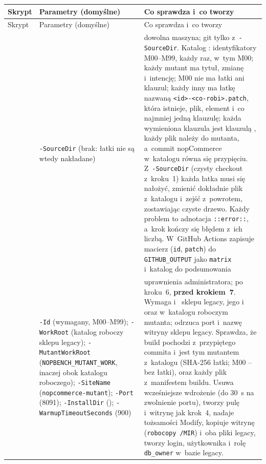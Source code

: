 {\footnotesize
\begin{xltabular}{\linewidth}{@{}>{\raggedright\arraybackslash}p{3.1cm} >{\raggedright\arraybackslash}p{3.7cm} >{\raggedright\arraybackslash}X@{}}
\toprule
Skrypt & Parametry (domyślne) & Co sprawdza i~co tworzy \\
\midrule
\endfirsthead
\toprule
Skrypt & Parametry (domyślne) & Co sprawdza i~co tworzy \\
\midrule
\endhead
\bottomrule
\endlastfoot
{} & \texttt{-SourceDir} (brak: łatki nie są wtedy nakładane) &
  dowolna maszyna; git tylko z~\texttt{-SourceDir}. Katalog :
  identyfikatory M00--M99, każdy raz, w~tym M00; każdy mutant ma tytuł, zmianę i~intencję;
  M00 nie ma łatki ani klauzul; każdy inny ma łatkę nazwaną \texttt{<id>-<co-robi>.patch},
  która istnieje, plik, element i~co najmniej jedną klauzulę; każda wymieniona klauzula jest
  klauzulą , każdy plik  należy do mutanta,
  a~commit nopCommerce w~katalogu równa się przypięciu. Z~\texttt{-SourceDir} (czysty checkout
  z~kroku~1) każda łatka musi się nałożyć, zmienić dokładnie plik z~katalogu i~zejść
  z~powrotem, zostawiając czyste drzewo. Każdy problem to adnotacja \texttt{::error::}, a~krok
  kończy się błędem z~ich liczbą. W~GitHub Actions zapisuje macierz (\texttt{id},
  \texttt{patch}) do \texttt{GITHUB\_OUTPUT} jako \texttt{matrix} i~katalog do podsumowania \\
 & \texttt{-Id} (wymagany, M00--M99); \texttt{-WorkRoot} (katalog
  roboczy sklepu legacy); \texttt{-MutantWorkRoot} (\texttt{NOPBENCH\_MUTANT\_WORK}, inaczej
   obok katalogu roboczego); \texttt{-SiteName} (\texttt{nopcommerce-mutant});
  \texttt{-Port} (8091); \texttt{-InstallDir} ();
  \texttt{-WarmupTimeoutSeconds} (900) &
  uprawnienia administratora; po kroku~6, \textbf{przed krokiem~7}. Wymaga 
  i~ sklepu legacy, jego 
  i~ oraz  w~katalogu roboczym mutanta; odrzuca port
  i~nazwę witryny sklepu legacy. Sprawdza, że build pochodzi z~przypiętego commita i~jest tym
  mutantem z~katalogu (SHA-256 łatki; M00 -- bez łatki), oraz każdy plik z~manifestem buildu.
  Usuwa wcześniejsze wdrożenie (do 30~s na zwolnienie portu), tworzy pulę i~witrynę jak krok~4,
  nadaje tożsamości Modify, kopiuje witrynę (\texttt{robocopy /MIR}) i~oba pliki
   legacy, tworzy login, użytkownika i~rolę \texttt{db\_owner} w~bazie legacy.

\end{xltabular}}
